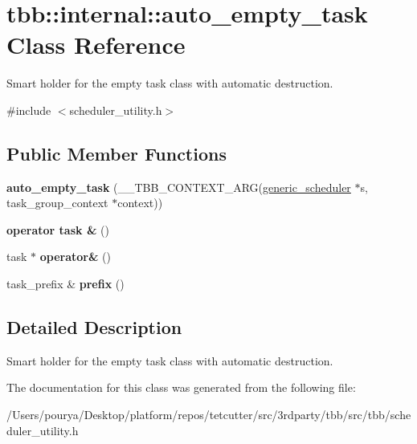 \hypertarget{classtbb_1_1internal_1_1auto__empty__task}{}\section{tbb\+:\+:internal\+:\+:auto\+\_\+empty\+\_\+task Class Reference}
\label{classtbb_1_1internal_1_1auto__empty__task}


Smart holder for the empty task class with automatic destruction.  




{\ttfamily \#include $<$scheduler\+\_\+utility.\+h$>$}

\subsection*{Public Member Functions}
\begin{DoxyCompactItemize}
\item 
\hypertarget{classtbb_1_1internal_1_1auto__empty__task_afb1aec7ac7ea6fc8291fdb67a6cb7c5e}{}{\bfseries auto\+\_\+empty\+\_\+task} (\+\_\+\+\_\+\+T\+B\+B\+\_\+\+C\+O\+N\+T\+E\+X\+T\+\_\+\+A\+R\+G(\hyperlink{classtbb_1_1internal_1_1generic__scheduler}{generic\+\_\+scheduler} $\ast$s, task\+\_\+group\+\_\+context $\ast$context))\label{classtbb_1_1internal_1_1auto__empty__task_afb1aec7ac7ea6fc8291fdb67a6cb7c5e}

\item 
\hypertarget{classtbb_1_1internal_1_1auto__empty__task_ac17cd33999edd8ff13ac7005f9ac334b}{}{\bfseries operator task \&} ()\label{classtbb_1_1internal_1_1auto__empty__task_ac17cd33999edd8ff13ac7005f9ac334b}

\item 
\hypertarget{classtbb_1_1internal_1_1auto__empty__task_ad13c1ea056df482f2f1692ff16201873}{}task $\ast$ {\bfseries operator\&} ()\label{classtbb_1_1internal_1_1auto__empty__task_ad13c1ea056df482f2f1692ff16201873}

\item 
\hypertarget{classtbb_1_1internal_1_1auto__empty__task_ae85fb42cc6116169fcf448eb36333226}{}task\+\_\+prefix \& {\bfseries prefix} ()\label{classtbb_1_1internal_1_1auto__empty__task_ae85fb42cc6116169fcf448eb36333226}

\end{DoxyCompactItemize}


\subsection{Detailed Description}
Smart holder for the empty task class with automatic destruction. 

The documentation for this class was generated from the following file\+:\begin{DoxyCompactItemize}
\item 
/\+Users/pourya/\+Desktop/platform/repos/tetcutter/src/3rdparty/tbb/src/tbb/scheduler\+\_\+utility.\+h\end{DoxyCompactItemize}
